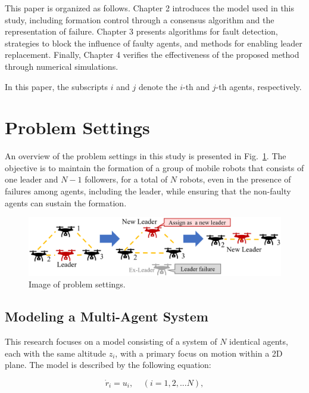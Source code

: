 \documentclass[a4paper,fleqn,10pt,twocolumn]{SICE_ISCS}
\newcommand{\Figref}[1]{{Fig.~\ref{#1}}}
\begin{document}
This paper is organized as follows. Chapter 2 introduces the model used in this study, including formation control through a consensus algorithm and the representation of failure. Chapter 3 presents algorithms for fault detection, strategies to block the influence of faulty agents, and methods for enabling leader replacement. Finally, Chapter 4 verifies the effectiveness of the proposed method through numerical simulations.

In this paper, the subscripts $i$ and $j$ denote the $i$-th and $j$-th agents, respectively.

\section{Problem Settings}
An overview of the problem settings in this study is presented in \Figref{Nice_image_fault}.
The objective is to maintain the formation of a group of mobile robots that consists of one leader and $N-1$ followers, for a total of $N$ robots, even in the presence of failures among agents, including the leader, while ensuring that the non-faulty agents can sustain the formation.
\begin{figure}[b]
	\begin{center}
		\includegraphics[width=\linewidth]{Fig/Nice_image_fault.eps}
		\caption{Image of problem settings.}
		\label{Nice_image_fault}
	\end{center}
	\vspace{-2mm}
\end{figure}

\subsection{Modeling a Multi-Agent System}
This research focuses on a model consisting of a system of $N$ identical agents, each with the same altitude $z_i$, with a primary focus on motion within a 2D plane. The model is described by the following equation:

\begin{equation}
	\label{modeling}
	\dot{r}_i=u_i,\ \ \ \ \ (i=1,2,...N),
\end{equation}
\end{document}
